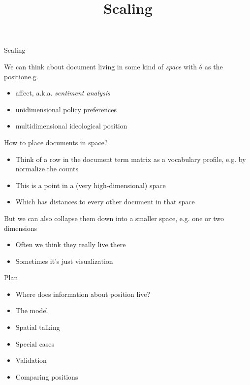 \documentclass{hertieteaching}
\title{Scaling}
\begin{document}
{
\begin{frame}
\maketitle
\end{frame}}
\addtocounter{page}{-1}

\begin{frame}{Scaling}

We can think about document living in some kind of \textit{space} with $\theta$ as the positione.g.
\begin{itemize}
  \item affect, a.k.a. \textit{sentiment analysis}
  \item unidimensional policy preferences
  \item multidimensional ideological position
\end{itemize}

How to place documents in space?
\begin{itemize}
  \item Think of a row in the document term matrix as a vocabulary profile, e.g. by normalize the counts
  \item This is a point in a (very high-dimensional) space
  \item Which has distances to every other document in that space
\end{itemize}
But we can also collapse them down into a smaller space, e.g. one or two dimensions
\begin{itemize}
  \item Often we think they really live there
  \item Sometimes it's just visualization
\end{itemize}
\end{frame}

\begin{frame}{Plan}
\begin{itemize}
  \item Where does information about position live?
  \item The model
  \item Spatial talking
  \item Special cases
  \item Validation
  \item Comparing positions
\end{itemize}


\end{frame}
\end{document}
